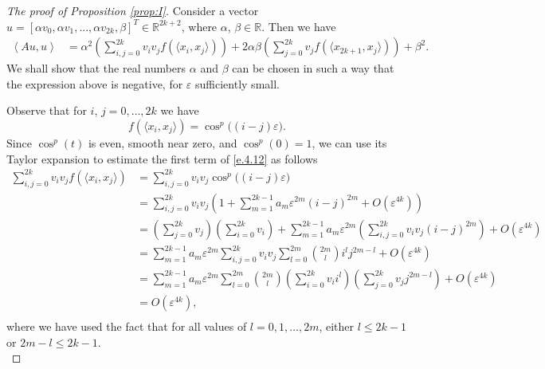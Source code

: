 \documentclass[11pt, leqno]{amsart}
\theoremstyle{definition}
\numberwithin{equation}{section}
\begin{document}
\begin{proof}[The proof of Proposition \ref{prop:I}]
Consider a vector $u = [ \alpha v_0, \alpha v_1, ..., \alpha v_{2k}, \beta]^T \in \mathbb{R}^{2k+2}$, where $\alpha$, $\beta \in \mathbb R$.  Then we have
\begin{equation}\label{e.4.12}
\begin{aligned}
\left\langle  Au,u  \right\rangle & = \alpha^2 \left( \sum_{i,j=0}^{2k} v_i v_j f( \langle x_{i}, x_j \rangle) \right) + 2 \alpha \beta \left( \sum_{j=0}^{2k} v_j f( \langle x_{2k+1}, x_j \rangle) \right) + \beta^2.
\end{aligned}
\end{equation}
We shall show that the real numbers $\alpha$ and $\beta$ can be chosen in such a way that the expression above is negative, for $\varepsilon$ sufficiently small. 

Observe that for $ i$, $j =  0, \dots, 2k$ we have $$  f( \langle x_i, x_j \rangle) = \cos^p \big( (i-j) \varepsilon \big). $$
Since $\cos^p(t)$ is even, smooth near zero, and $\cos^p(0) = 1$, we can use its Taylor expansion to estimate the first term of \eqref{e.4.12} as follows 
\begin{equation}\label{e.4.13}
\begin{aligned}
\sum_{i,j=0}^{2k} v_i v_j f( \langle x_{i}, x_j \rangle) & = \sum_{i,j=0}^{2k} v_i v_j \cos^p \big( (i - j) \varepsilon \big) \\
& = \sum_{i,j=0}^{2k} v_i v_j \left( 1 + \sum_{m=1}^{2k-1} a_m \varepsilon^{2m} (i-j)^{2m} + O(\varepsilon^{4k})  \right) \\
& = \left( \sum_{j=0}^{2k}  v_j \right)\left( \sum_{i = 0}^{2k} v_i \right)  + \sum_{m=1}^{2k-1} a_m \varepsilon^{2m} \left( \sum_{i,j=0}^{2k} v_i v_j (i-j)^{2m} \right)  +  O(\varepsilon^{4k})  \\
& = \sum_{m=1}^{2k-1} a_m \varepsilon^{2m} \sum_{i,j=0}^{2k} v_i v_j \sum_{l=0}^{2m} \binom{2m}{l} i^l j^{2m-l}  +  O(\varepsilon^{4k})  \\
& = \sum_{m=1}^{2k-1} a_m \varepsilon^{2m} \sum_{l=0}^{2m} \binom{2m}{l} \left( \sum_{i=0}^{2k} v_i   i^l \right) \left( \sum_{j=0}^{2k} v_j  j^{2m-l} \right)  +  O(\varepsilon^{4k})  \\
& =  O(\varepsilon^{4k}),  \\
\end{aligned}
\end{equation}
where we have used the fact that   for all  values of $l =0, 1, \dots, 2m$, either $l \leq 2k-1$ or $2m-l \leq 2k-1$.\\ 




\end{proof}
\end{document}
